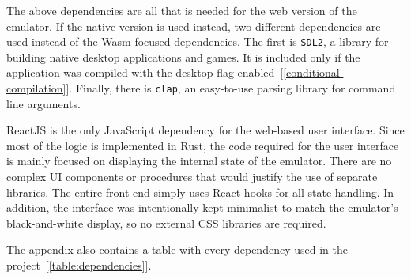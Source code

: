 The above dependencies are all that is needed for the web version of the emulator. If the native version is used instead, two different dependencies are used instead of the Wasm-focused dependencies.
The first is \verb+SDL2+, a library for building native desktop applications and games.
It is included only if the application was compiled with the desktop flag enabled~[\ref{conditional-compilation}].
Finally, there is \verb+clap+, an easy-to-use parsing library for command line arguments.


ReactJS is the only JavaScript dependency for the web-based user interface.
Since most of the logic is implemented in Rust, the code required for the user interface is mainly focused on displaying the internal state of the emulator.
There are no complex UI components or procedures that would justify the use of separate libraries.
The entire front-end simply uses React hooks for all state handling.
In addition, the interface was intentionally kept minimalist to match the emulator's black-and-white display, so no external CSS libraries are required.

The appendix also contains a table with every dependency used in the project~[\ref{table:dependencies}].
